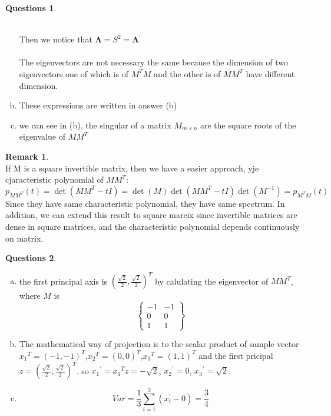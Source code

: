 \documentclass[a4paper,11pt]{article}
\theoremstyle{definition}
\newtheorem{quests}{Questions}
\newtheorem{rem}[theo]{Remark}%
\begin{document}
\begin{quests}
\begin{enumerate}[(a)]
\leavevmode\\
Then we notice that $\mathbf {\Lambda}=S^2=\mathbf {\Lambda }^\prime$\\
\leavevmode\\
The eigenvectors are not necessary the same because the dimension of two eigenvectors one of which is of $M^{T}M$ and the other is of $MM^{T}$ have different dimension. 
\item These expressions are written in answer (b)
\item we can see in (b), the singular of a matrix $ M_{m \times n}$ are the square roots of the eigenvalue of $MM^{T}$
\end{enumerate}
\begin{rem}
\leavevmode\\
If  M is a square invertible matrix, then we have a easier approach, yje cjaracteristic polynomial of $MM^{T}$: $p_{MM^{T}}(t)=\det \left(MM^{T}-tI\right)=\det \left(M \right)\det \left(MM^{T}-tI\right) \det \left(M^{-1} \right) = p_{M^{T}M}(t)$\\
Since they have same characteristic polynomial, they have same spectrum. In addition, we can extend this result to square mareix since invertible matrices are dense in square matrices, and the characteristic polynomial depends continuously on matrix.
\end{rem}
\end{quests}

\newpage
\begin{quests}
\leavevmode\\
\begin{enumerate}[(a)]
\item the first principal axis is $(\frac{\sqrt{2}}{2},\frac{\sqrt{2}}{2})^T$ by calulating the eigenvector of $MM^T$, where $M$ is
$$
\left\{
\begin{matrix}
-1  &  -1\\
0   &  0\\
1	&  1
\end{matrix}
\right\}
$$
\item The mathematical way of projection is to the scalar product of sample vector ${x_1}^T=(-1,-1)^T$,${x_2}^T=(0,0)^T$,${x_3}^T=(1,1)^T$ and the first pricipal $z=(\frac{\sqrt{2}}{2},\frac{\sqrt{2}}{2})^T$.
so ${x_1}^\prime={x_1}^Tz=-\sqrt{2}$, ${x_2}^\prime=0$, ${x_3}^\prime=\sqrt{2}$.

\item $$
Var=\frac{1}{3}\sum_{i=1}^3(x_i^\prime-0)=\frac{3}{4}
$$
\end{enumerate}
\end{quests}
\end{document}
